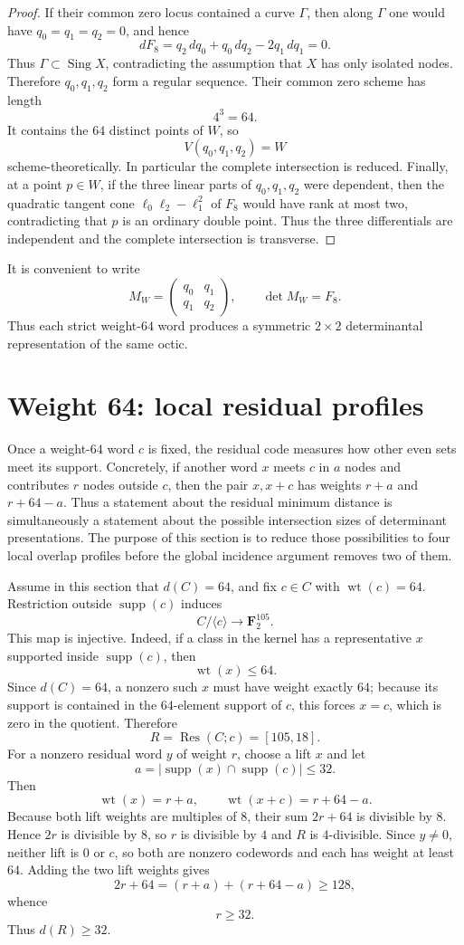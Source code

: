 \documentclass[11pt,reqno]{amsart}
\theoremstyle{remark}
\newcommand{\F}{\mathbf F}
\newcommand{\supp}{\operatorname{supp}}
\newcommand{\wt}{\operatorname{wt}}
\newcommand{\Res}{\operatorname{Res}}
\begin{document}
\begin{proof}
If their common zero locus contained a curve $\Gamma$, then along $\Gamma$ one would have $q_0=q_1=q_2=0$, and hence
\[
dF_8=q_2\,dq_0+q_0\,dq_2-2q_1\,dq_1=0.
\]
Thus $\Gamma\subset\operatorname{Sing}X$, contradicting the assumption that $X$ has only isolated nodes.  Therefore $q_0,q_1,q_2$ form a regular sequence.  Their common zero scheme has length
\[
4^3=64.
\]
It contains the $64$ distinct points of $W$, so
\[
V(q_0,q_1,q_2)=W
\]
scheme-theoretically.  In particular the complete intersection is reduced.  Finally, at a point $p\in W$, if the three linear parts of $q_0,q_1,q_2$ were dependent, then the quadratic tangent cone $\ell_0\ell_2-\ell_1^2$ of $F_8$ would have rank at most two, contradicting that $p$ is an ordinary double point.  Thus the three differentials are independent and the complete intersection is transverse.
\end{proof}

It is convenient to write
\[
M_W=\begin{pmatrix}q_0&q_1\\ q_1&q_2\end{pmatrix},
\qquad \det M_W=F_8.
\]
Thus each strict weight-$64$ word produces a symmetric $2\times2$ determinantal representation of the same octic.

\section{Weight 64: local residual profiles}\label{sec:res64}
Once a weight-$64$ word $c$ is fixed, the residual code measures how other even sets meet its support.  Concretely, if another word $x$ meets $c$ in $a$ nodes and contributes $r$ nodes outside $c$, then the pair $x,x+c$ has weights $r+a$ and $r+64-a$.  Thus a statement about the residual minimum distance is simultaneously a statement about the possible intersection sizes of determinant presentations.  The purpose of this section is to reduce those possibilities to four local overlap profiles before the global incidence argument removes two of them.

Assume in this section that $d(C)=64$, and fix $c\in C$ with $\wt(c)=64$.  Restriction outside $\supp(c)$ induces
\[
C/\langle c\rangle\longrightarrow\F_2^{105}.
\]
This map is injective.  Indeed, if a class in the kernel has a representative $x$ supported inside $\supp(c)$, then
\[
\wt(x)\le64.
\]
Since $d(C)=64$, a nonzero such $x$ must have weight exactly $64$; because its support is contained in the $64$-element support of $c$, this forces $x=c$, which is zero in the quotient.  Therefore
\[
R=\Res(C;c)=[105,18].
\]
For a nonzero residual word $y$ of weight $r$, choose a lift $x$ and let
\[
a=|\supp(x)\cap\supp(c)|\le32.
\]
Then
\[
\wt(x)=r+a,
\qquad
\wt(x+c)=r+64-a.
\]
Because both lift weights are multiples of $8$, their sum $2r+64$ is divisible by $8$.  Hence $2r$ is divisible by $8$, so $r$ is divisible by $4$ and $R$ is $4$-divisible.  Since $y\ne0$, neither lift is $0$ or $c$, so both are nonzero codewords and each has weight at least $64$.  Adding the two lift weights gives
\[
2r+64=(r+a)+(r+64-a)\ge128,
\]
whence
\[
r\ge32.
\]
Thus $d(R)\ge32$.
\end{document}
